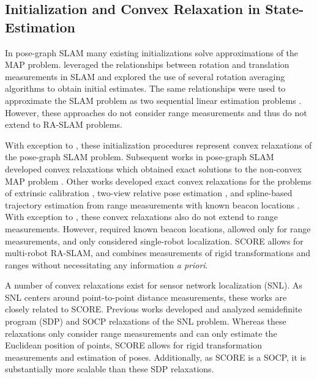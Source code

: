\subsection{Initialization and Convex Relaxation in State-Estimation}

In pose-graph SLAM many existing initializations solve approximations of the MAP
problem. \cite{carlone15icra} leveraged the relationships between rotation and
translation measurements in SLAM and explored the use of several rotation
averaging algorithms
\cite{martinec07cvpr,govindu01cvpr,fredriksson13lnsc,tron14tac} to obtain
initial estimates. The same relationships were used to approximate the SLAM
problem as two sequential linear estimation problems \cite{carlone14ijrr}.
However, these approaches do not consider range measurements and thus do not
extend to RA-SLAM problems.

With exception to \cite{tron14tac}, these initialization procedures represent
convex relaxations of the pose-graph SLAM problem. Subsequent works in
pose-graph SLAM developed convex relaxations which obtained exact
solutions to the non-convex MAP problem \cite{rosen19ijrr,
carlone15iros,briales17ral,tron15rssworkshop, fan20tro
}. Other works developed exact convex relaxations for
the problems of extrinsic calibration \cite{giamou19ral}, two-view relative pose
estimation \cite{briales18cvpr,garcia-salguero21ivc}, and spline-based
trajectory estimation from range measurements with known beacon locations
\cite{pacholska20ral}. With exception to \cite{pacholska20ral}, these convex
relaxations also do not extend to range measurements. However,
\cite{pacholska20ral} required known beacon locations, allowed only for range
measurements, and only considered single-robot localization. SCORE allows for
multi-robot RA-SLAM, and combines measurements of rigid transformations and
ranges without necessitating any information \textit{a priori}.

A number of convex relaxations exist for sensor network localization (SNL). As
SNL centers around point-to-point distance measurements, these works are closely
related to SCORE. Previous works  developed and analyzed semidefinite
program (SDP) \cite{biswas06tase,
so07mathematicalprogramming, shamsi13dgo} and SOCP \cite{tseng07siam,naddafzadeh-shirazi14twc,doherty01infocom,
srirangarajan08twc}
relaxations of the SNL problem. Whereas these relaxations only
consider range measurements and can only estimate the Euclidean position of
points, SCORE allows for rigid transformation measurements and estimation of
poses. Additionally, as SCORE is a SOCP, it is substantially more scalable than
these SDP relaxations.

